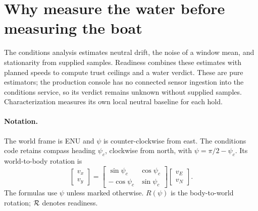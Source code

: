 \section{Why measure the water before measuring the boat}
\label{sec:cond}

The conditions analysis estimates neutral drift, the noise of a window mean,
and stationarity from supplied samples. Readiness combines these estimates with
planned speeds to compute trust ceilings and a water verdict. These are pure
estimators; the production console has no connected sensor ingestion into the
conditions service, so its verdict remains unknown without supplied samples.
Characterization measures its own local neutral baseline for each hold.

\paragraph{Notation.} The world frame is ENU and $\psi$ is counter-clockwise
from east. The conditions code retains compass heading $\psi_c$, clockwise from
north, with $\psi=\pi/2-\psi_c$. Its world-to-body rotation is
\[
 \begin{bmatrix}v_x\\v_y\end{bmatrix}
 =\begin{bmatrix}\sin\psi_c&\cos\psi_c\\-\cos\psi_c&\sin\psi_c\end{bmatrix}
 \begin{bmatrix}v_E\\v_N\end{bmatrix}.
\]
The formulas use $\psi$ unless marked otherwise. $R(\psi)$ is the body-to-world
rotation; $\mathcal R$ denotes readiness.










